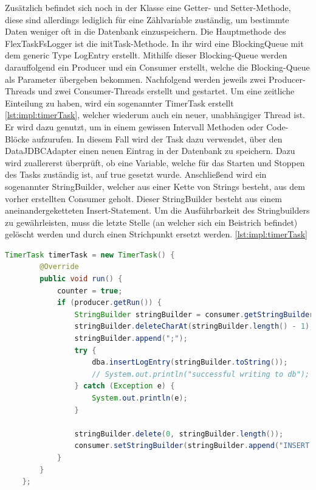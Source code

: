 Zusätzlich befindet sich noch in der Klasse eine Getter- und Setter-Methode, diese sind allerdings lediglich für eine Zählvariable zuständig, um bestimmte Daten weniger oft in die Datenbank einzuspeichern. 
Die Hauptmethode des FlexTaskFsLogger ist die initTask-Methode. In ihr wird eine BlockingQueue mit dem generic Type LogEntry erstellt. Mithilfe dieser Blocking-Queue werden darauffolgend ein Producer und ein Consumer erstellt, welche die Blocking-Queue als Parameter übergeben bekommen. Nachfolgend werden jeweils zwei Producer-Threads und zwei Consumer-Threads erstellt und gestartet. Um eine zeitliche Einteilung zu haben, wird ein sogenannter TimerTask erstellt \ref{lst:impl:timerTask}, welcher wiederum auch ein neuer, unabhängiger Thread ist. Er wird dazu genutzt, um in einem gewissen Intervall Methoden oder Code-Blöcke aufzurufen. In diesem Fall wird der Task dazu verwendet, über den DataJDBCAdapter einen neuen Eintrag in der Datenbank zu speichern. Dazu wird zuallererst überprüft, ob eine Variable, welche für das Starten und Stoppen des Tasks zuständig ist, auf true gesetzt wurde. Anschließend wird ein sogenannter StringBuilder, welcher aus einer Kette von Strings besteht, aus dem vorher erstellten Consumer geholt. Dieser StringBuilder besteht aus einem aneinandergeketteten Insert-Statement. Um die Ausführbarkeit des Stringbuilders zu gewährleisten, muss die letzte Stelle (an welcher sich ein Beistrich befindet) gelöscht werden und durch einen Strichpunkt ersetzt werden. \ref{lst:impl:timerTask}


\begin{lstlisting}[language=java,caption=TimerTask,label=lst:impl:timerTask]
    TimerTask timerTask = new TimerTask() {
        @Override
        public void run() {
            counter = true;
            if (producer.getRun()) {
                StringBuilder stringBuilder = consumer.getStringBuilder();
                stringBuilder.deleteCharAt(stringBuilder.length() - 1);
                stringBuilder.append(";");
                try {
                    dba.insertLogEntry(stringBuilder.toString());
                    // System.out.println("successful writing to db");
                } catch (Exception e) {
                    System.out.println(e);
                }

                stringBuilder.delete(0, stringBuilder.length());
                consumer.setStringBuilder(stringBuilder.append("INSERT INTO flexlogger(dp_name, value, unit, timestamp) VALUES "));
            }
        }
    }; 
\end{lstlisting}

